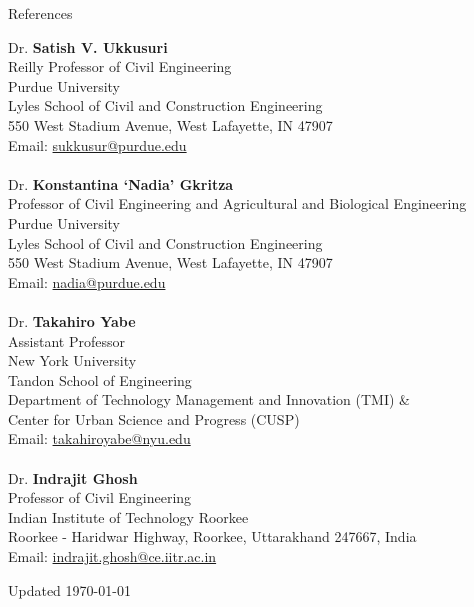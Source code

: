 \documentclass{CV} %
\begin{document}
\begin{rSection}{References}
    \begin{tabbing}
    Dr. \textbf{Satish V. Ukkusuri} \\
    Reilly Professor of Civil Engineering \\
    Purdue University \\ 
    Lyles School of Civil and Construction Engineering \\
    550 West Stadium Avenue, West Lafayette, IN 47907 \\
    Email: \href{mailto:sukkusur@purdue.edu}{sukkusur@purdue.edu} \\
    
    \\ Dr. \textbf{Konstantina `Nadia' Gkritza} \\
    Professor of Civil Engineering and Agricultural and Biological Engineering \\
    Purdue University \\ 
    Lyles School of Civil and Construction Engineering \\
    550 West Stadium Avenue, West Lafayette, IN 47907 \\
    Email: \href{mailto:nadia@purdue.edu}{nadia@purdue.edu} \\

    \\ Dr. \textbf{Takahiro Yabe} \\
    Assistant Professor \\
    New York University \\
    Tandon School of Engineering \\
    Department of Technology Management and Innovation (TMI) \& \\
    Center for Urban Science and Progress (CUSP) \\
    Email: \href{mailto:takahiroyabe@nyu.edu}{takahiroyabe@nyu.edu} \\

    \\ Dr. \textbf{Indrajit Ghosh} \\
    Professor of Civil Engineering \\
    Indian Institute of Technology Roorkee \\ 
    Roorkee - Haridwar Highway, Roorkee, Uttarakhand 247667, India \\
    Email: \href{mailto:indrajit.ghosh@ce.iitr.ac.in}{indrajit.ghosh@ce.iitr.ac.in} \\
    \end{tabbing}
\end{rSection}

\vspace*{\fill}
\centering Updated \today
\end{document}
